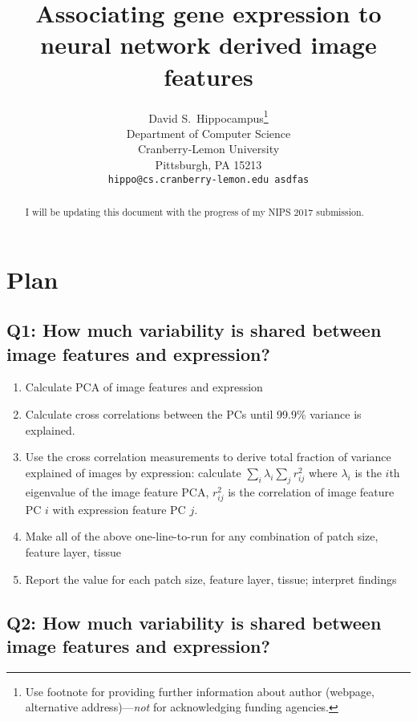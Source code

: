 \documentclass{article}
\title{Associating gene expression to neural network derived image features}
\author{
  David S.~Hippocampus\thanks{Use footnote for providing further
    information about author (webpage, alternative
    address)---\emph{not} for acknowledging funding agencies.} \\
  Department of Computer Science\\
  Cranberry-Lemon University\\
  Pittsburgh, PA 15213 \\
  \texttt{hippo@cs.cranberry-lemon.edu  asdfas} \\
}
\begin{document}

\maketitle

\begin{abstract}
I will be updating this document with the progress of  my NIPS 2017 submission.
\end{abstract}

\section*{Plan}

\subsection*{Q1: How much variability is shared between image features and expression?} 
\begin{enumerate}
\item Calculate PCA of image features and expression

\item Calculate cross correlations between the PCs until 99.9\% variance is explained.

\item Use the cross correlation measurements to derive total fraction of variance explained of images by expression: calculate $\sum_i \lambda_i \sum_j r^2_{ij} $ where $\lambda_i$ is the $i$th eigenvalue of the image feature PCA, $r^2_{ij}$ is the correlation of image feature PC $i$ with expression feature PC $j$.

\item Make all of the above one-line-to-run for any combination of patch size, feature layer, tissue

\item Report the value for each patch size, feature layer, tissue; interpret findings

\end{enumerate}

\subsection*{Q2: How much variability is shared between image features and expression?} 
\end{document}

